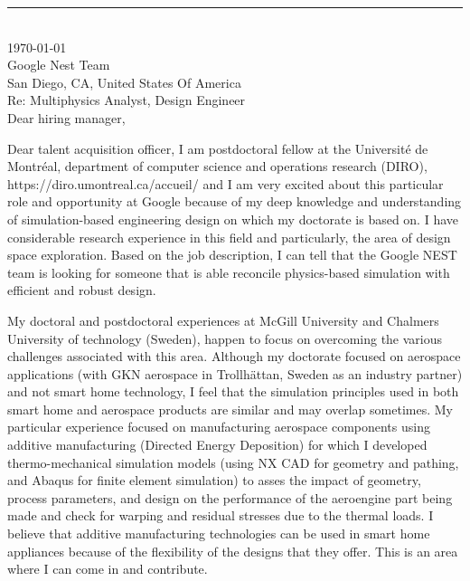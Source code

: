 \documentclass[12pt]{article} %
\begin{document}
\medskip %
\rule[0pt]{\textwidth}{1pt}\\
\today\\[6pt]


Google Nest Team\\
San Diego, CA, United States Of America\\
Re: Multiphysics Analyst, Design Engineer\\[6pt] \medskip
Dear hiring manager,

\medskip %
Dear talent acquisition officer,
I am postdoctoral fellow at the Université de Montréal, department of computer science and operations research (DIRO), https://diro.umontreal.ca/accueil/ and I am very excited about this particular role and opportunity at Google because  of my deep knowledge and understanding of simulation-based engineering design on which my doctorate is based on. I have considerable research experience in this field and particularly, the area of design space exploration. Based on the job description, I can tell that the Google NEST team is looking for someone that is able reconcile physics-based simulation with efficient and robust design.

\medskip %

My doctoral and postdoctoral experiences at McGill University and Chalmers University of technology (Sweden), happen to focus on overcoming the various challenges associated with this area. Although my doctorate focused on aerospace applications (with GKN aerospace in Trollhättan, Sweden as an industry partner) and not smart home technology, I feel that the simulation principles used in both smart home and aerospace products are similar and may overlap sometimes. My particular experience focused on manufacturing aerospace components using additive manufacturing (Directed Energy Deposition) for which I developed thermo-mechanical simulation models (using NX CAD for geometry and pathing, and Abaqus for finite element simulation) to asses the impact of geometry, process parameters, and design on the performance of the aeroengine part being made and check for warping and residual stresses due to the thermal loads. I believe that additive manufacturing technologies can be used in smart home appliances because of the flexibility of the designs that they offer. This is an area where I can come in and contribute. 
\end{document}
